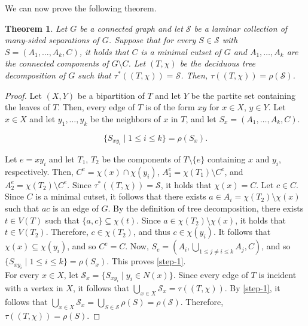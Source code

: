 \documentclass[12pt]{amsart}
\renewcommand{\S}{\mathcal{S}}
\newtheorem{theorem}{Theorem}
\begin{document}
We can now prove the following theorem.
\begin{theorem}
\label{thm:deciduous-minimal}
Let $G$ be a connected graph and let $\S$ be a laminar collection of many-sided separations of $G$. Suppose that for every $S \in \S$ with $S = (A_1, \hdots, A_k, C)$, it holds that $C$ is a minimal cutset of $G$ and $A_1, \hdots, A_k$ are the connected components of $G \setminus C$. Let $(T, \chi)$ be the deciduous tree decomposition of $G$ such that $\tau^*((T, \chi)) = \S$. Then, $\tau((T, \chi)) = \rho(\S)$.
\end{theorem}
\begin{proof}
Let $(X, Y)$ be a bipartition of $T$ and let $Y$ be the partite set containing the leaves of $T$. Then, every edge of $T$ is of the form $xy$ for $x \in X$, $y \in Y$. Let $x \in X$ and let $y_1, \hdots, y_k$ be the neighbors of $x$ in $T$, and let $S_x = (A_1, \hdots, A_k, C)$.

\begin{equation}\label{step-1} \{S_{xy_i} \mid 1 \leq i \leq k\} = \rho(S_x)\text{.}
\end{equation}

Let $e = xy_i$ and let $T_1$, $T_2$ be the components of $T \setminus \{e\}$ containing $x$ and $y_i$, respectively. Then, $C^e = \chi(x) \cap \chi(y_i)$, $A_1^e = \chi(T_1) \setminus C^e$, and $A_2^e = \chi(T_2) \setminus C^e$. Since $\tau^*((T, \chi)) = \mathcal{S}$, it holds that $\chi(x) = C$. Let $c \in C$. Since $C$ is a minimal cutset, it follows that there exists $a \in A_i = \chi(T_2) \setminus \chi(x)$ such that $ac$ is an edge of $G$. By the definition of tree decomposition, there exists $t \in V(T)$ such that $\{a, c\} \subseteq \chi(t)$. Since $a \in \chi(T_2) \setminus \chi(x)$, it holds that $t \in V(T_2)$. Therefore, $c \in \chi(T_2)$, and thus $c \in \chi(y_i)$. It follows that $\chi(x) \subseteq \chi(y_i)$, and so $C^e = C$. Now, $S_e = (A_i, \bigcup_{1\leq j \neq i \leq k} A_j, C)$, and so $\{S_{xy_i} \mid 1 \leq i \leq k\} = \rho(S_x)$. This proves \eqref{step-1}.\\

For every $x \in X$, let $\S_x = \{S_{xy_i} \mid y_i \in N(x)\}$. Since every edge of $T$ is incident with a vertex in $X$, it follows that $\bigcup_{x \in X} \S_x = \tau((T, \chi))$. By \eqref{step-1}, it follows that $\bigcup_{x \in X} \S_x = \bigcup_{S \in \S} \rho(S) = \rho(\S)$. Therefore, $\tau((T, \chi)) = \rho(S)$.
\end{proof}

\end{document}
